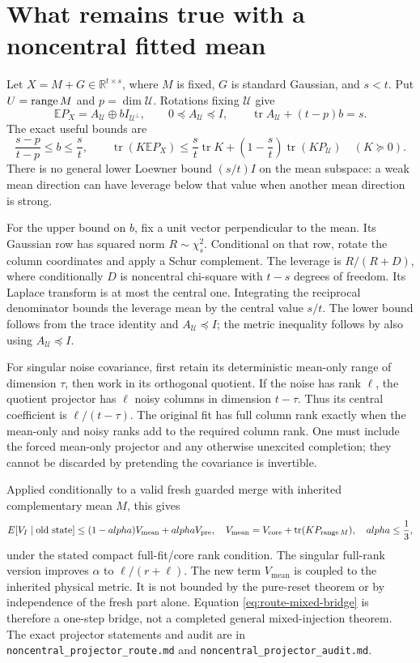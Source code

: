 \documentclass[11pt,oneside,openany,a4paper]{report}
\numberwithin{equation}{chapter}
\theoremstyle{definition}
\theoremstyle{remark}
\newcommand{\sourcefile}[1]{{\small\nolinkurl{#1}}}
\newcommand{\R}{\mathbb R}\newcommand{\E}{\mathbb E}\newcommand{\PP}{\mathbb P}\newcommand{\Prb}{\mathbb P}
\DeclareMathOperator{\tr}{tr}\DeclareMathOperator{\rank}{rank}
\begin{document}
\section{What remains true with a noncentral fitted mean}

Let $X=M+G\in\R^{t\times s}$, where $M$ is fixed, $G$ is standard
Gaussian, and $s<t$.  Put $U=\operatorname{range} M$ and
$p=\dim\mathcal U$.  Rotations fixing $\mathcal U$ give
\[
 \E P_X=A_{\mathcal U}\oplus bI_{\mathcal U^\perp},
 \qquad0\preceq A_{\mathcal U}\preceq I,
 \qquad\tr A_{\mathcal U}+(t-p)b=s.
\]
The exact useful bounds are
\begin{equation}
 \frac{s-p}{t-p}\leq b\leq\frac st,
 \qquad
 \tr(K\E P_X)
 \leq\frac st\tr K+\left(1-\frac st\right)\tr(KP_{\mathcal U})
 \quad(K\succeq0).
 \label{eq:route-noncentral}
\end{equation}
There is no general lower Loewner bound $(s/t)I$ on the mean subspace:
a weak mean direction can have leverage below that value when another
mean direction is strong.

For the upper bound on $b$, fix a unit vector perpendicular to the
mean.  Its Gaussian row has squared norm $R\sim\chi_s^2$.  Conditional
on that row, rotate the column coordinates and apply a Schur complement.
The leverage is $R/(R+D)$, where conditionally $D$ is noncentral
chi-square with $t-s$ degrees of freedom.  Its Laplace transform is at
most the central one.  Integrating the reciprocal denominator bounds
the leverage mean by the central value $s/t$.  The lower bound follows
from the trace identity and $A_{\mathcal U}\preceq I$; the metric
inequality follows by also using $A_{\mathcal U}\preceq I$.

For singular noise covariance, first retain its deterministic mean-only
range of dimension $\tau$, then work in its orthogonal quotient.
If the noise has rank $\ell$, the quotient projector has $\ell$ noisy
columns in dimension $t-\tau$.  Thus its central coefficient is
$\ell/(t-\tau)$.  The original fit has full column rank exactly when
the mean-only and noisy ranks add to the required column rank.  One
must include the forced mean-only projector and any otherwise unexcited
completion; they cannot be discarded by pretending the covariance is
invertible.

Applied conditionally to a valid fresh guarded merge with inherited
complementary mean $M$, this gives
\begin{equation}
 \E[V_I\mid\text{old state}]
 \leq(1-\alpha)V_{\mathrm{mean}}+\alpha V_{\mathrm{pre}},
 \quad
 V_{\mathrm{mean}}=V_{\mathrm{core}}+\tr(KP_{\range M}),
 \quad\alpha\leq\frac13,
 \label{eq:route-mixed-bridge}
\end{equation}
under the stated compact full-fit/core rank condition.  The singular
full-rank version improves $\alpha$ to $\ell/(r+\ell)$.  The new term
$V_{\mathrm{mean}}$ is coupled to the inherited physical metric.  It is
not bounded by the pure-reset theorem or by independence of the fresh
part alone.  Equation \eqref{eq:route-mixed-bridge} is therefore a
one-step bridge, not a completed general mixed-injection theorem.
The exact projector statements and audit are in
\sourcefile{noncentral_projector_route.md} and
\sourcefile{noncentral_projector_audit.md}.
\end{document}
